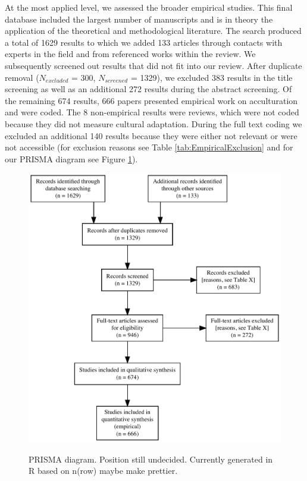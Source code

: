 At the most applied level, we assessed the broader empirical studies.
This final database included the largest number of manuscripts and is in
theory the application of the theoretical and methodological literature.
The search produced a total of 1629 results to which we added 133
articles through contacts with experts in the field and from referenced
works within the review. We subsequently screened out results that did
not fit into our review. After duplicate removal (\(N_{excluded}\) =
300, \(N_{screened}\) = 1329), we excluded 383 results in the title
screening as well as an additional 272 results during the abstract
screening. Of the remaining 674 results, 666 papers presented empirical
work on acculturation and were coded. The 8 non-empirical results were
reviews, which were not coded because they did not measure cultural
adaptation. During the full text coding we excluded an additional 140
results because they were either not relevant or were not accessible
(for exclusion reasons see Table \ref{tab:EmpiricalExclusion} and for
our PRISMA diagram see Figure \ref{fig:PRISMA}).

\begin{figure}[h]
\centering
\caption{PRISMA diagram. Position still undecided. Currently generated in R based on n(row) maybe make prettier.}
\includegraphics[width=\textwidth]{Figures/PRISMA}
\label{fig:PRISMA}
\end{figure}

